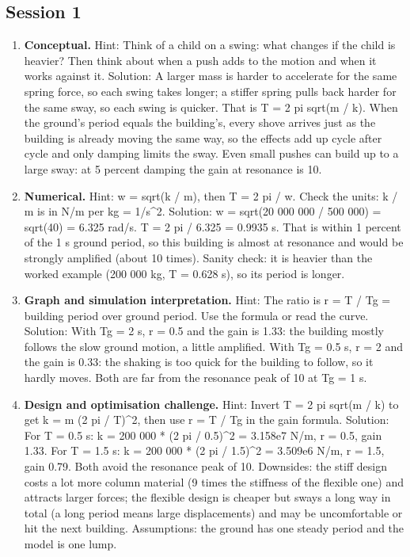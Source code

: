 \documentclass[11pt,a4paper]{article}
\begin{document}
\subsection*{Session 1}
\begin{enumerate}[nosep]
\item \textbf{Conceptual.} Hint: Think of a child on a swing: what changes if the child is heavier? Then think about when a push adds to the motion and when it works against it. Solution: A larger mass is harder to accelerate for the same spring force, so each swing takes longer; a stiffer spring pulls back harder for the same sway, so each swing is quicker. That is T = 2 pi sqrt(m / k). When the ground's period equals the building's, every shove arrives just as the building is already moving the same way, so the effects add up cycle after cycle and only damping limits the sway. Even small pushes can build up to a large sway: at 5 percent damping the gain at resonance is 10.
\item \textbf{Numerical.} Hint: w = sqrt(k / m), then T = 2 pi / w. Check the units: k / m is in N/m per kg = 1/s\textasciicircum{}2. Solution: w = sqrt(20 000 000 / 500 000) = sqrt(40) = 6.325 rad/s. T = 2 pi / 6.325 = 0.9935 s. That is within 1 percent of the 1 s ground period, so this building is almost at resonance and would be strongly amplified (about 10 times). Sanity check: it is heavier than the worked example (200 000 kg, T = 0.628 s), so its period is longer.
\item \textbf{Graph and simulation interpretation.} Hint: The ratio is r = T / Tg = building period over ground period. Use the formula or read the curve. Solution: With Tg = 2 s, r = 0.5 and the gain is 1.33: the building mostly follows the slow ground motion, a little amplified. With Tg = 0.5 s, r = 2 and the gain is 0.33: the shaking is too quick for the building to follow, so it hardly moves. Both are far from the resonance peak of 10 at Tg = 1 s.
\item \textbf{Design and optimisation challenge.} Hint: Invert T = 2 pi sqrt(m / k) to get k = m (2 pi / T)\textasciicircum{}2, then use r = T / Tg in the gain formula. Solution: For T = 0.5 s: k = 200 000 * (2 pi / 0.5)\textasciicircum{}2 = 3.158e7 N/m, r = 0.5, gain 1.33. For T = 1.5 s: k = 200 000 * (2 pi / 1.5)\textasciicircum{}2 = 3.509e6 N/m, r = 1.5, gain 0.79. Both avoid the resonance peak of 10. Downsides: the stiff design costs a lot more column material (9 times the stiffness of the flexible one) and attracts larger forces; the flexible design is cheaper but sways a long way in total (a long period means large displacements) and may be uncomfortable or hit the next building. Assumptions: the ground has one steady period and the model is one lump.
\end{enumerate}
\end{document}
